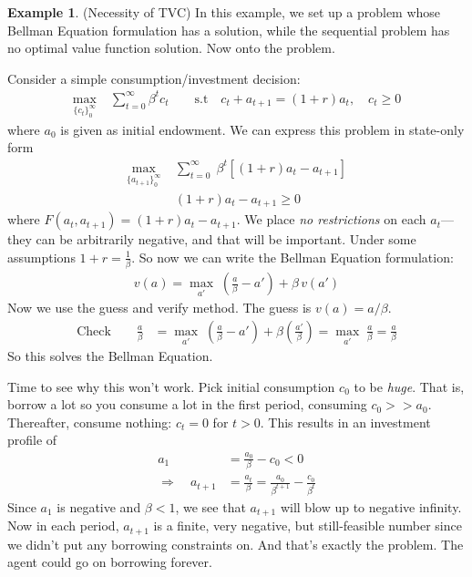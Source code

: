 \documentclass[12pt]{book}
\numberwithin{equation}{section} %
\theoremstyle{plain}
\theoremstyle{definition}
\newtheorem{ex}[thm]{Example}
\theoremstyle{remark}
\newcommand{\sumtinfz}{\sum^\infty_{t=0}}
\begin{document}
\clearpage
\begin{ex}{(Necessity of TVC)}
In this example, we set up a problem whose Bellman Equation formulation
has a solution, while the sequential problem has no optimal value
function solution. Now onto the problem.

Consider a simple consumption/investment decision:
\begin{align*}
  \max_{\{c_t\}_0^\infty} \; &\sumtinfz \beta^t c_t
  \qquad
  \text{s.t}\quad
  c_t + a_{t+1} = (1+r)a_t
  ,\quad
  c_t \geq 0
\end{align*}
where $a_0$ is given as initial endowment. We can express this problem
in state-only form
\begin{align*}
  \max_{\{a_{t+1}\}_0^\infty} \;
  &\sumtinfz \; \beta^t [(1+r)a_t - a_{t+1}] \\
  & (1+r)a_t - a_{t+1} \geq 0
\end{align*}
where $F(a_t,a_{t+1}) = (1+r)a_t - a_{t+1}$.
We place \emph{no restrictions} on each $a_t$---they can be arbitrarily
negative, and that will be important.
Under some assumptions $1+r = \frac{1}{\beta}$.
So now we can write the Bellman Equation formulation:
\begin{align*}
  v(a) = \max_{a'} \; \left(\frac{a}{\beta} - a'\right) + \beta \, v(a')
\end{align*}
Now we use the guess and verify method. The guess is $v(a) = a/\beta$.
\begin{align*}
  \text{Check} \qquad
  \frac{a}{\beta}
  &= \max_{a'} \;
  \left(\frac{a}{\beta} - a'\right)
  + \beta \left(\frac{a'}{\beta}\right)
  =
  \max_{a'} \;
  \frac{a}{\beta}
  =
  \frac{a}{\beta}
\end{align*}
So this solves the Bellman Equation.

Time to see why this won't work. Pick initial consumption $c_0$ to be
\emph{huge}. That is, borrow a lot so you consume a lot in the first
period, consuming $c_0 >> a_0$.
Thereafter, consume nothing: $c_t=0$ for $t>0$. This results in an
investment profile of
\begin{align*}
  a_{1} &= \frac{a_0}{\beta} - c_0 < 0 \\
  \Rightarrow \quad
  a_{t+1} &= \frac{a_t}{\beta}
  = \frac{a_0}{\beta^{t+1}} - \frac{c_0}{\beta^t}
\end{align*}
Since $a_1$ is negative and $\beta<1$, we see that $a_{t+1}$ will blow
up to negative infinity.
Now in each period, $a_{t+1}$ is a finite, very negative, but
still-feasible number since we didn't put any borrowing constraints on.
And that's exactly the problem. The agent could go on borrowing forever.


\end{ex}
\end{document}

